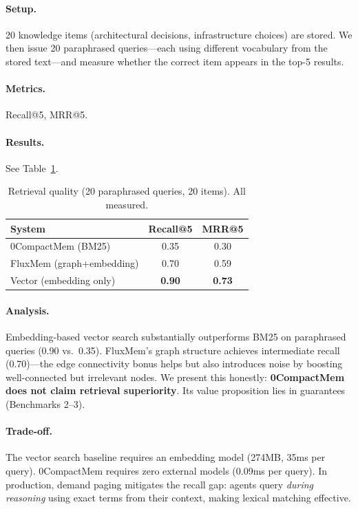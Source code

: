 \documentclass[10pt,twocolumn]{article}
\begin{document}
\paragraph{Setup.} 20 knowledge items (architectural decisions, infrastructure choices) are stored. We then issue 20 paraphrased queries---each using different vocabulary from the stored text---and measure whether the correct item appears in the top-5 results.

\paragraph{Metrics.} Recall@5, MRR@5.

\paragraph{Results.} See Table~\ref{tab:retention}.

\begin{table}[t]
\centering
\caption{Retrieval quality (20 paraphrased queries, 20 items). All measured.}
\label{tab:retention}
\small
\begin{tabular}{lcc}
\toprule
System & Recall@5 & MRR@5 \\
\midrule
0CompactMem (BM25)         & 0.35 & 0.30 \\
FluxMem (graph+embedding)  & 0.70 & 0.59 \\
Vector (embedding only)    & \textbf{0.90} & \textbf{0.73} \\
\bottomrule
\end{tabular}
\end{table}

\paragraph{Analysis.} Embedding-based vector search substantially outperforms BM25 on paraphrased queries (0.90 vs.\ 0.35). FluxMem's graph structure achieves intermediate recall (0.70)---the edge connectivity bonus helps but also introduces noise by boosting well-connected but irrelevant nodes. We present this honestly: \textbf{0CompactMem does not claim retrieval superiority}. Its value proposition lies in guarantees (Benchmarks 2--3).

\paragraph{Trade-off.} The vector search baseline requires an embedding model (274MB, 35ms per query). 0CompactMem requires zero external models (0.09ms per query). In production, demand paging mitigates the recall gap: agents query \emph{during reasoning} using exact terms from their context, making lexical matching effective.
\end{document}
